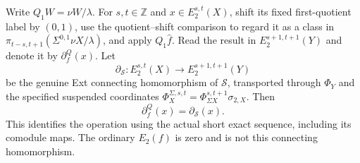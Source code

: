 \begin{theorem}
Write $Q_1W=\nu W/\lambda$. For $s,t\in\mathbb Z$ and
$x\in E_2^{s,t}(X)$, shift its fixed first-quotient label by $(0,1)$,
use the quotient--shift comparison to regard it as a class in
$\pi_{t-s,t+1}(\Sigma^{0,1}\nu X/\lambda)$, and apply
$Q_1\widehat f$. Read the result in $E_2^{s+1,t+1}(Y)$ and denote it
by $\partial_f^Q(x)$. Let
\[
\partial_{\mathcal S}:E_2^{s,t}(X)\longrightarrow
E_2^{s+1,t+1}(Y)
\]
be the genuine Ext connecting homomorphism of $\mathcal S$, transported
through $\Phi_Y$ and the specified suspended coordinates
$\Phi_X^{\Sigma,s,t}=\Phi_{\Sigma X}^{s,t+1}\sigma_{2,X}$.
Then
\[
\partial_f^Q(x)=\partial_{\mathcal S}(x).
\]
This identifies the operation using the actual short exact sequence,
including its comodule maps. The ordinary $E_2(f)$ is zero and is not
this connecting homomorphism.
\end{theorem}
